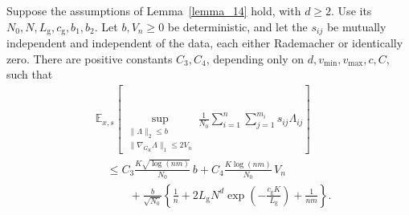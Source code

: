 \documentclass[twoside,11pt]{article}
\newenvironment{revision}{\color{revisionred}}{}
\begin{document}
\begin{revision}
\begin{lemma}
\label{Lemma_18}
Suppose the assumptions of Lemma~\ref{lemma_14} hold, with $d\geq2$.
Use its $N_0,N,L_{\mathrm g},c_{\mathrm g},b_1,b_2$.
Let $b,V_n\geq0$ be deterministic, and let the $s_{ij}$ be mutually independent
and independent of the data, each either Rademacher or identically zero.
There are positive constants $C_3,C_4$, depending only on
$d,v_{\min},v_{\max},c,C$, such that
\begin{equation}
\label{eq_knn_width_expectation}
\begin{aligned}
&\mathbb E_{x,s}\left[
 \sup_{\substack{\|\varLambda\|_2\leq b\\
                  \|\nabla_{G_K}\varLambda\|_1\leq2V_n}}
 \frac1{N_0}\sum_{i=1}^n\sum_{j=1}^{m_i}s_{ij}\varLambda_{ij}
 \right]\\
&\quad\leq C_3\frac{K\sqrt{\log(nm)}}{N_0}\,b
          +C_4\frac{K\log(nm)}{N_0}\,V_n\\
&\qquad\quad+\frac b{\sqrt{N_0}}\left\{
 \frac1n+2L_{\mathrm g}N^d
           \exp\left(-\frac{c_{\mathrm g}K}{L_{\mathrm g}}\right)
 +\frac1{nm}\right\}.
\end{aligned}
\end{equation}
\end{lemma}
\end{revision}
\end{document}
